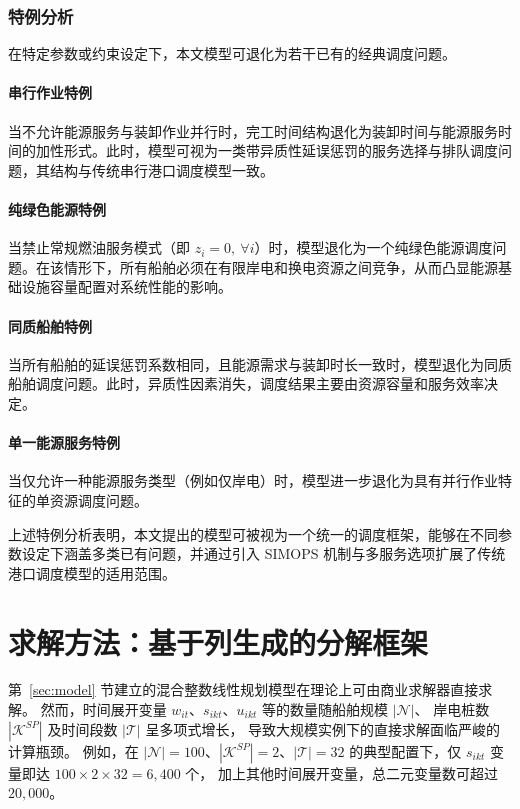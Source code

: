 \documentclass[UTF8, a4paper, 12pt]{ctexart}
\begin{document}
\subsubsection{特例分析}

在特定参数或约束设定下，本文模型可退化为若干已有的经典调度问题。

\paragraph{串行作业特例}
当不允许能源服务与装卸作业并行时，完工时间结构退化为装卸时间与能源服务时间的加性形式。此时，模型可视为一类带异质性延误惩罚的服务选择与排队调度问题，其结构与传统串行港口调度模型一致。

\paragraph{纯绿色能源特例}
当禁止常规燃油服务模式（即 $z_i=0,\ \forall i$）时，模型退化为一个纯绿色能源调度问题。在该情形下，所有船舶必须在有限岸电和换电资源之间竞争，从而凸显能源基础设施容量配置对系统性能的影响。

\paragraph{同质船舶特例}
当所有船舶的延误惩罚系数相同，且能源需求与装卸时长一致时，模型退化为同质船舶调度问题。此时，异质性因素消失，调度结果主要由资源容量和服务效率决定。

\paragraph{单一能源服务特例}
当仅允许一种能源服务类型（例如仅岸电）时，模型进一步退化为具有并行作业特征的单资源调度问题。

上述特例分析表明，本文提出的模型可被视为一个统一的调度框架，能够在不同参数设定下涵盖多类已有问题，并通过引入 SIMOPS 机制与多服务选项扩展了传统港口调度模型的适用范围。



\section{求解方法：基于列生成的分解框架}
\label{sec:cg}

第~\ref{sec:model} 节建立的混合整数线性规划模型在理论上可由商业求解器直接求解。
然而，时间展开变量 $w_{it}$、$s_{ikt}$、$u_{ikt}$ 等的数量随船舶规模 $|\mathcal{N}|$、
岸电桩数 $|\mathcal{K}^{SP}|$ 及时间段数 $|\mathcal{T}|$ 呈多项式增长，
导致大规模实例下的直接求解面临严峻的计算瓶颈。
例如，在 $|\mathcal{N}| = 100$、$|\mathcal{K}^{SP}| = 2$、$|\mathcal{T}| = 32$
的典型配置下，仅 $s_{ikt}$ 变量即达 $100 \times 2 \times 32 = 6{,}400$ 个，
加上其他时间展开变量，总二元变量数可超过 $20{,}000$。
\end{document}
